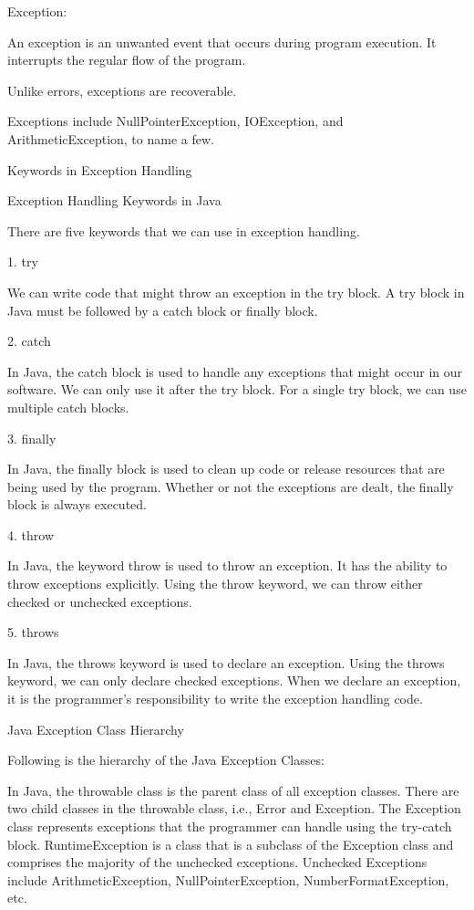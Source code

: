  

Exception:
 

An exception is an unwanted event that occurs during program execution. It interrupts the regular flow of the program.

Unlike errors, exceptions are recoverable.

Exceptions include NullPointerException, IOException, and ArithmeticException, to name a few.


Keywords in Exception Handling
 

 

Exception Handling Keywords in Java
 

There are five keywords that we can use in exception handling.

 

1. try
 

We can write code that might throw an exception in the try block. A try block in Java must be followed by a catch block or finally block.

 

2. catch
 

In Java, the catch block is used to handle any exceptions that might occur in our software. We can only use it after the try block. For a single try block, we can use multiple catch blocks.

 

3. finally
 

In Java, the finally block is used to clean up code or release resources that are being used by the program. Whether or not the exceptions are dealt, the finally block is always executed.

 

4. throw
 

In Java, the keyword throw is used to throw an exception. It has the ability to throw exceptions explicitly. Using the throw keyword, we can throw either checked or unchecked exceptions.

 

5. throws
 

In Java, the throws keyword is used to declare an exception. Using the throws keyword, we can only declare checked exceptions. When we declare an exception, it is the programmer's responsibility to write the exception handling code.

Java Exception Class Hierarchy
 

Following is the hierarchy of the Java Exception Classes:

In Java, the throwable class is the parent class of all exception classes.
There are two child classes in the throwable class, i.e., Error and Exception.
The Exception class represents exceptions that the programmer can handle using the try-catch block.
RuntimeException is a class that is a subclass of the Exception class and comprises the majority of the unchecked exceptions. Unchecked Exceptions include ArithmeticException, NullPointerException, NumberFormatException, etc.
 
